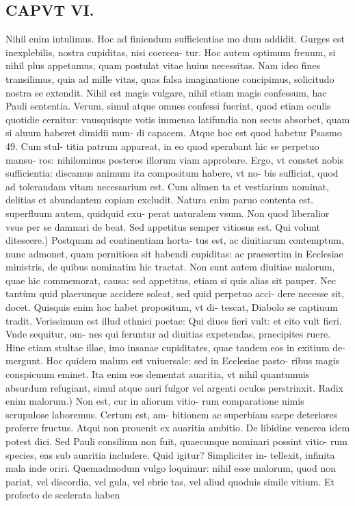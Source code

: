 \documentclass{article}
\begin{document}
\begin{pages}
\section*{CAPVT VI. }
\marginpar{[ p.77 ]}\pstart Nihil enim intulimus. Hoc ad finiendum sufficientiae mo dum addidit. Gurges est inexplebilis, nostra cupiditas, nisi coercea- tur. Hoc autem optimum frenum, si nihil plus appetamus, quam postulat vitae huius necessitas. Nam ideo fines transilimus, quia ad mille vitas, quas falsa imaginatione concipimus, solicitudo nostra se extendit. Nihil est magis vulgare, nihil etiam magis confessum, hac Pauli sententia. Verum, simul atque omnes confessi fuerint, quod etiam oculis quotidie cernitur: vnusquisque votis immensa latifundia non secus absorbet, quam si aluum haberet dimidii mun- di capacem. Atque hoc est quod habetur Psasmo 49. Cum stul- titia patrum appareat, in eo quod sperabant hic se perpetuo mansu- ros: nihilominus posteros illorum viam approbare. Ergo, vt constet nobis sufficientia: discamus animum ita compositum habere, vt no- bis sufficiat, quod ad tolerandam vitam necessarium est. Cum alimen ta et vestiarium nominat, delitias et abundantem copiam excludit. Natura enim paruo contenta est. superfluum autem, quidquid exu- perat naturalem vsum. Non quod liberalior vsus per se damnari de beat. Sed appetitus semper vitiosus est.  \pend\pstart Qui volunt ditescere.) Postquam ad continentiam horta- tus est, ac diuitiarum contemptum, nunc admonet, quam pernitiosa sit habendi cupiditas: ac praesertim in Ecclesiae ministris, de quibus nominatim hic tractat. Non sunt autem diuitiae malorum, quae hic commemorat, causa: sed appetitus, etiam si quis alias sit pauper. Nec tantùm quid plaerunque accidere soleat, sed quid perpetuo acci- dere necesse sit, docet. Quisquis enim hoc habet propositum, vt di- tescat, Diabolo se captiuum tradit. Verissimum est illud ethnici poetae: Qui diues fieri vult: et cito vult fieri. Vnde sequitur, om- nes qui feruntur ad diuitias expetendas, praecipites ruere. Hine etiam stultae illae, imo insanae cupiditates, quae tandem eos in exitium de- mergunt. Hoc quidem malum est vniuersale: sed in Ecclesiae pasto- ribus magis conspicuum eminet. Ita enim eos dementat auaritia, vt nihil quantumuis absurdum refugiant, simul atque auri fulgor vel argenti oculos perstrinxit.  \pend\pstart Radix enim malorum.) Non est, cur in aliorum vitio- rum comparatione nimis scrupulose laboremus. Certum est, am- bitionem ac superbiam saepe deteriores proferre fructus. Atqui non prouenit ex auaritia ambitio. De libidine venerea idem potest dici. Sed Pauli consilium non fuit, quaecunque nominari possint vitio- rum species, eas sub auaritia includere. Quid igitur? Simpliciter in- tellexit, infinita mala inde oriri. Quemadmodum vulgo loquimur: nihil esse malorum, quod non pariat, vel discordia, vel gula, vel ebrie tas, vel aliud quoduis simile vitium. Et profecto de scelerata haben  \pend

\end{pages}
\end{document}
